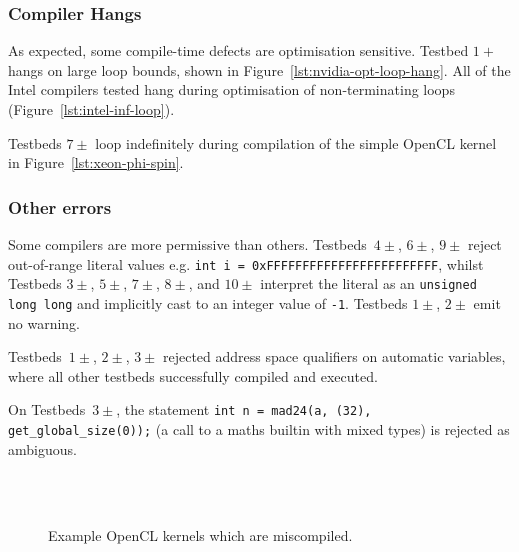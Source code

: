 \subsubsection{Compiler Hangs}

As expected, some compile-time defects are optimisation sensitive. Testbed $1+$ hangs on large loop bounds, shown in Figure~\ref{lst:nvidia-opt-loop-hang}. All of the Intel compilers tested hang during optimisation of non-terminating loops (Figure~\ref{lst:intel-inf-loop}).

Testbeds $7\pm$ loop indefinitely during compilation of the simple OpenCL kernel in Figure~\ref{lst:xeon-phi-spin}.


\subsubsection{Other errors}

Some compilers are more permissive than others. Testbeds~$4\pm$, $6\pm$, $9\pm$ reject out-of-range literal values e.g. \texttt{int i = 0xFFFFFFFFFFFFFFFFFFFFFFFF}, whilst Testbeds $3\pm$, $5\pm$, $7\pm$, $8\pm$, and $10\pm$ interpret the literal as an \texttt{unsigned long long} and implicitly cast to an integer value of \texttt{-1}. Testbeds $1\pm$, $2\pm$ emit no warning.

Testbeds~$1\pm$, $2\pm$, $3\pm$ rejected address space qualifiers on automatic variables, where all other testbeds successfully compiled and executed.

On Testbeds~$3\pm$, the statement \texttt{int n = mad24(a, (32), get\_global\_size(0));} (a call to a maths builtin with mixed types) is rejected as ambiguous.



\begin{figure}
  \centering %
  \\%
  \\%
  \caption[Example kernels which are miscompiled]{%
    Example OpenCL kernels which are miscompiled.%
  }%
\end{figure}

